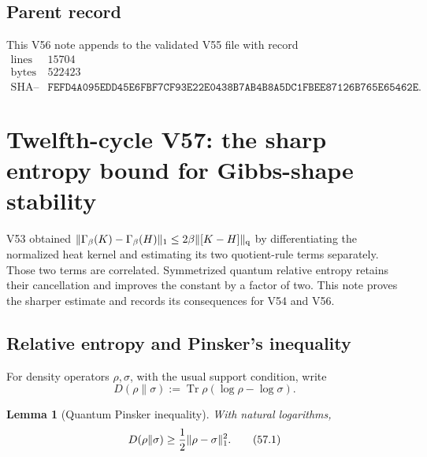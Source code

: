 \documentclass[11pt]{article}
\newtheorem{lemma}[theorem]{Lemma}
\theoremstyle{remark}
\begin{document}
\subsection{Parent record}

This V56 note appends to the validated V55 file with record
\[
\begin{array}{c|c}
\text{lines}&15704\\
\text{bytes}&522423\\
\text{SHA--256}&
\texttt{FEFD4A095EDD45E6FBF7CF93E22E0438B7AB4B8A5DC1FBEE87126B765E65462E}.
\end{array}
\]


\section{Twelfth-cycle V57: the sharp entropy bound for Gibbs-shape
stability}
\label{sec:v12v57}

V53 obtained
\(\|\Gamma_\beta(K)-\Gamma_\beta(H)\|_1
 \leq2\beta\|[K-H]\|_{\rm q}\)
by differentiating the normalized heat kernel and estimating its two
quotient-rule terms separately.  Those two terms are correlated.
Symmetrized quantum relative entropy retains their cancellation and
improves the constant by a factor of two.  This note proves the
sharper estimate and records its consequences for V54 and V56.

\subsection{Relative entropy and Pinsker's inequality}

For density operators \(\rho,\sigma\), with the usual support
condition, write
\[
 D(\rho\|\sigma)
 :=
 \operatorname{Tr}\rho(\log\rho-\log\sigma).
\]

\begin{lemma}[Quantum Pinsker inequality]
\label{lem:v12v57-Pinsker}
With natural logarithms,
\begin{equation}
 D(\rho\|\sigma)
 \geq{1\over2}\|\rho-\sigma\|_1^2.                \tag{57.1}
\end{equation}
\end{lemma}
\end{document}
